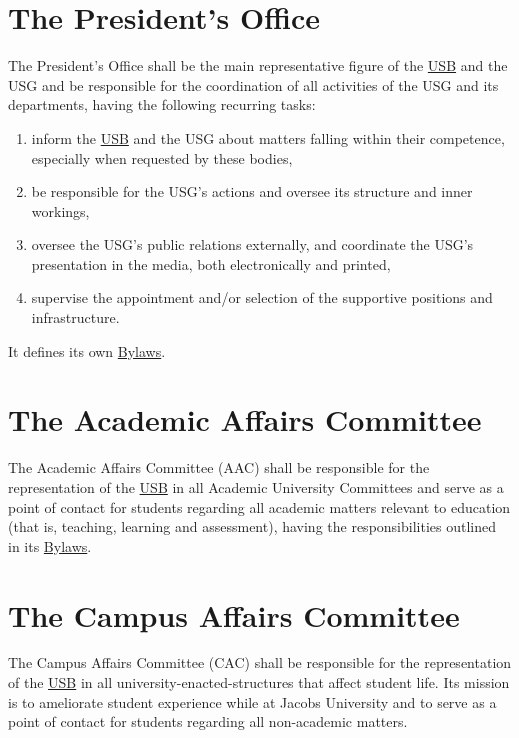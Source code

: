 \section{The President's Office} 
\label{PresidentOfficeDef}
The President's Office shall be the main representative figure of the \hyperref[studentbody]{USB} and the USG and be responsible for the coordination of all activities of the USG and its departments, having the following recurring tasks:
\begin{enumerate}
\item {} inform the \hyperref[studentbody]{USB} and the USG about matters falling within their competence, especially when requested by these bodies,
\item be responsible for the USG's actions and oversee its structure and inner workings,
\item oversee the USG's public relations externally, and coordinate the USG's presentation in the media, both electronically and printed,
\item supervise the appointment and/or selection of the supportive positions and infrastructure.
\end{enumerate}
It defines its own \hyperref[PresByLawsDef]{Bylaws}.

\section{The Academic Affairs Committee}
\label{AACdef}
The Academic Affairs Committee (AAC) shall be responsible for the representation of the \hyperref[studentbody]{USB} in all Academic University Committees and serve as a point of contact for students regarding all academic matters relevant to education (that is, teaching, learning and assessment), having the responsibilities outlined in its  \hyperref[AACByLawsdef]{Bylaws}.


\section{The Campus Affairs Committee} 
\label{CACdef}
The Campus Affairs Committee (CAC) shall be responsible for the representation of the \hyperref[studentbody]{USB} in all university-enacted-structures that affect student life. Its mission is to ameliorate student experience while at Jacobs University and to serve as a point of contact for students regarding all non-academic matters.


